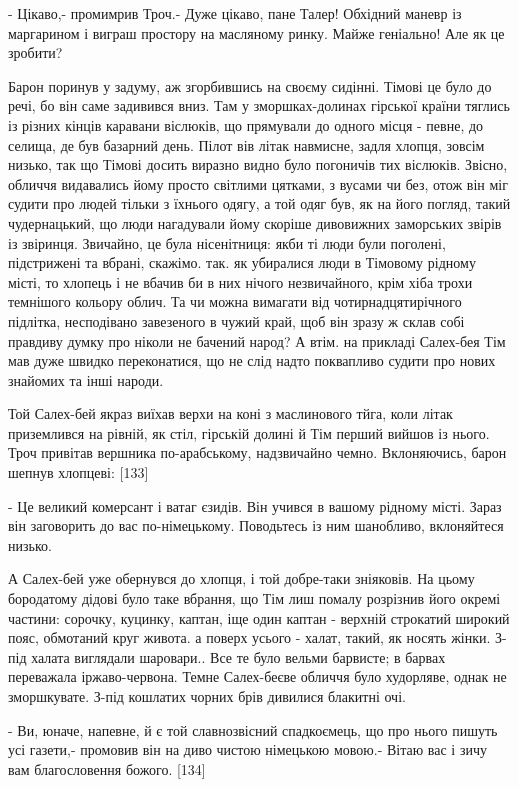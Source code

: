- Цікаво,- промимрив Троч.- Дуже цікаво, пане Талер! Обхідний маневр із маргарином і виграш простору на масляному ринку. Майже геніально! Але як це зробити?

Барон поринув у задуму, аж згорбившись на своєму сидінні. Тімові це було до речі, бо він саме задивився вниз. Там у зморшках-долинах гірської країни тяглись із різних кінців каравани віслюків, що прямували до одного місця - певне, до селища, де був базарний день. Пілот вів літак навмисне, задля хлопця, зовсім низько, так що Тімові досить виразно видно було погоничів тих віслюків. Звісно, обличчя видавались йому просто світлими цятками, з вусами чи без, отож він міг судити про людей тільки з їхнього одягу, а той одяг був, як на його погляд, такий чудернацький, що люди нагадували йому скоріше дивовижних заморських звірів із звіринця. Звичайно, це була нісенітниця: якби ті люди були поголені, підстрижені та вбрані, скажімо. так. як убиралися люди в Тімовому рідному місті, то хлопець і не вбачив би в них нічого незвичайного, крім хіба трохи темнішого кольору облич. Та чи можна вимагати від чотирнадцятирічного підлітка, несподівано завезеного в чужий край, щоб він зразу ж склав собі правдиву думку про ніколи не бачений народ? А втім. на прикладі Салех-бея Тім мав дуже швидко переконатися, що не слід надто поквапливо судити про нових знайомих та інші народи.

Той Салех-бей якраз виїхав верхи на коні з маслинового тйга, коли літак приземлився на рівній, як стіл, гірській долині й Тім перший вийшов із нього. Троч привітав вершника по-арабському, надзвичайно чемно. Вклоняючись, барон шепнув хлопцеві: [133]

- Це великий комерсант і ватаг єзидів. Він учився в вашому рідному місті. Зараз він заговорить до вас по-німецькому. Поводьтесь із ним шанобливо, вклоняйтеся низько.

А Салех-бей уже обернувся до хлопця, і той добре-таки зніяковів. На цьому бородатому дідові було таке вбрання, що Тім лиш помалу розрізнив його окремі частини: сорочку, куцинку, каптан, іще один каптан - верхній строкатий широкий пояс, обмотаний круг живота. а поверх усього - халат, такий, як носять жінки. З-під халата виглядали шаровари.. Все те було вельми барвисте; в барвах переважала іржаво-червона. Темне Салех-беєве обличчя було худорляве, однак не зморшкувате. З-під кошлатих чорних брів дивилися блакитні очі.

- Ви, юначе, напевне, й є той славнозвісний спадкоємець, що про нього пишуть усі газети,- промовив він на диво чистою німецькою мовою.- Вітаю вас і зичу вам благословення божого. [134]

